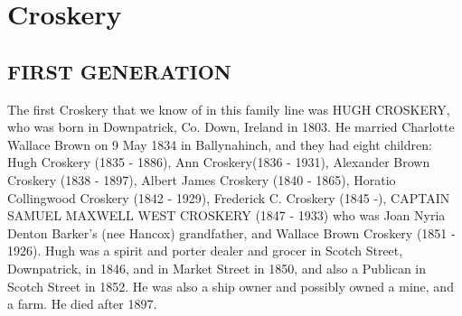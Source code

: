 \section{Croskery}

\subsection{FIRST GENERATION}

The first Croskery that we know of in this family line was \uppercase{Hugh Croskery}, who was born in Downpatrick, Co. Down, Ireland in 1803.  He married Charlotte Wallace Brown on 9 May 1834 in Ballynahinch,  and they had eight children: Hugh Croskery (1835 - 1886), Ann Croskery(1836 - 1931), Alexander Brown Croskery (1838 - 1897), Albert James Croskery (1840 - 1865), Horatio Collingwood Croskery (1842 - 1929), Frederick C. Croskery (1845 -), \uppercase{Captain Samuel Maxwell West Croskery} (1847 - 1933) who was Joan Nyria Denton Barker's (nee Hancox) grandfather, and Wallace Brown Croskery (1851 - 1926).
Hugh was a spirit and porter dealer and grocer in Scotch Street, Downpatrick, in 1846, and in Market Street in 1850, and also a Publican in Scotch Street in 1852. He was also a ship owner and possibly owned a mine, and a farm. He died after 1897.



